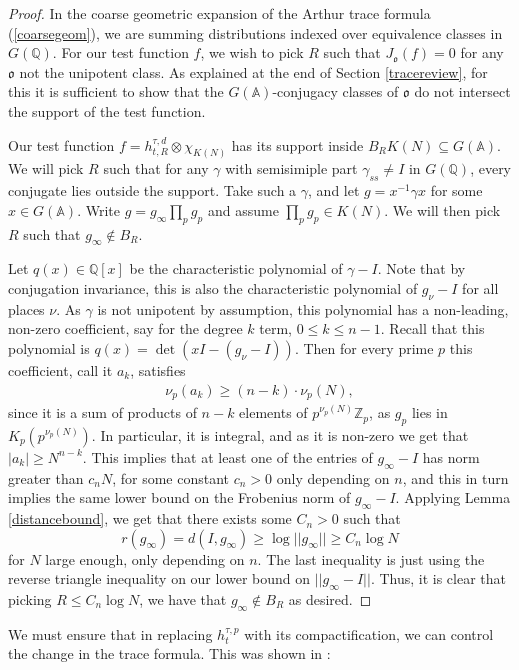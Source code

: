 \documentclass[11pt,reqno]{amsart}
\numberwithin{equation}{section}
\theoremstyle{definition}
\theoremstyle{remark}
\newcommand{\Q}{\mathbb{Q}}
\newcommand{\mf}[1]{\mathfrak{#1}}
\newcommand{\A}{\mathbb{A}}
\newcommand{\Z}{\mathbb{Z}}
\renewcommand{\subset}{\subseteq}
\begin{document}
\begin{proof}
\noindent  In the coarse geometric expansion of the Arthur trace formula (\ref{coarsegeom}), we are summing distributions indexed over equivalence classes in $G(\Q)$. For our test function $f$, we wish to pick $R$ such that $J_{\mf{o}}(f)=0$ for any $\mf{o}$ not the unipotent class. As explained at the end of Section \ref{tracereview}, for this it is sufficient to show that the $G(\A)$-conjugacy classes of $\mf{o}$ do not intersect the support of the test function.

Our test function $f=h^{\tau,d}_{t,R}\otimes \chi_{K(N)}$ has its support inside $B_R K(N)\subset G(\A)$. We will pick $R$ such that for any $\gamma$ with semisimiple part $\gamma_{ss}\neq I$ in $G(\Q)$, every conjugate lies outside the support. Take such a $\gamma$, and let $g = x^{-1}\gamma x$ for some $x\in G(\A)$. Write $g=g_\infty\prod_pg_p$ and assume $\prod_pg_p\in K(N)$. We will then pick $R$ such that $g_\infty\notin B_R$.

Let $q(x)\in\Q[x]$ be the characteristic polynomial of $\gamma-I$. Note that by conjugation invariance, this is also the characteristic polynomial of $g_\nu-I$ for all places $\nu$. As $\gamma$ is not unipotent by assumption, this polynomial has a non-leading, non-zero coefficient, say for the degree $k$ term, $0\leq k\leq n-1$. Recall that this polynomial is $q(x)=\det(xI-(g_\nu-I))$. Then for every prime $p$ this coefficient, call it $a_k$, satisfies
\begin{align*}
    \nu_p(a_k) \geq (n-k)\cdot\nu_p(N),
\end{align*}
since it is a sum of products of $n-k$ elements of $p^{\nu_p(N)}\Z_p$, as $g_p$ lies in $K_p(p^{\nu_p(N)})$. In particular, it is integral, and as it is non-zero we get that $|a_k|\geq N^{n-k}$. This implies that at least one of the entries of $g_\infty-I$ has norm greater than $c_n N$, for some constant $c_n>0$ only depending on $n$, and this in turn implies the same lower bound on the Frobenius norm of $g_\infty-I$. Applying Lemma \ref{distancebound}, we get that there exists some $C_n>0$ such that
$$r(g_\infty)=d(I,g_\infty)\geq \log||g_\infty||\geq C_n\log N$$
for $N$ large enough, only depending on $n$. The last inequality is just using the reverse triangle inequality on our lower bound on $||g_\infty-I||$. Thus, it is clear that picking $R\leq C_n\log N$, we have that $g_\infty\notin B_R$ as desired.
\end{proof}

\noindent We must ensure that in replacing $h_t^{\tau,p}$ with its compactification, we can control the change in the trace formula. This was shown in \cite{MzM2}:
\end{document}
